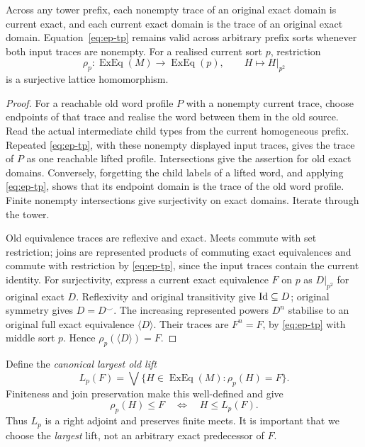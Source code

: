 \begin{proposition}
\label{prop:ep-exact-trace-surj}
Across any tower prefix, each nonempty trace of an original exact
domain is current exact, and each current exact domain is the trace
of an original exact domain. Equation~\eqref{eq:ep-tp} remains valid
across arbitrary prefix sorts whenever both input traces are nonempty.
For a realised current sort \(p\), restriction
\[
 \rho_p:\operatorname{ExEq}(M)\longrightarrow
                  \operatorname{ExEq}(p),\qquad
 H\longmapsto H|_{p^2}
 \tag{E1}\label{eq:ep-rho}
\]
is a surjective lattice homomorphism.
\end{proposition}
\begin{proof}
For a reachable old word profile \(P\) with a nonempty current
trace, choose endpoints of that trace and realise the word
between them in the old source. Read the actual intermediate
child types from the current homogeneous prefix. Repeated
\eqref{eq:ep-tp}, with these nonempty displayed input traces,
gives the trace of \(P\) as one reachable lifted profile.
Intersections give the assertion for old exact domains. Conversely,
forgetting the child labels of a lifted word, and applying
\eqref{eq:ep-tp}, shows that its endpoint domain is the trace of
the old word profile. Finite nonempty intersections give
surjectivity on exact domains. Iterate through the tower.

Old equivalence traces are reflexive and exact.
Meets commute with set restriction; joins are represented
products of commuting exact equivalences and commute with
restriction by \eqref{eq:ep-tp}, since the input traces contain
the current identity. For surjectivity, express a current exact
equivalence \(F\) on \(p\) as \(D|_{p^2}\) for original exact
\(D\). Reflexivity and original transitivity give
\(\mathrm{Id}\subseteq D\); original symmetry gives \(D=D^\smile\).
The increasing represented powers \(D^n\) stabilise to an
original full exact equivalence \(\langle D\rangle\).
Their traces are \(F^n=F\), by
\eqref{eq:ep-tp} with middle sort \(p\). Hence
\(\rho_p(\langle D\rangle)=F\).
\end{proof}

Define the \emph{canonical largest old lift}
\[
 L_p(F)=
 \bigvee\{H\in\operatorname{ExEq}(M):\rho_p(H)=F\}.
 \tag{E2}\label{eq:ep-old-largest}
\]
Finiteness and join preservation make this well-defined and give
\[
  \rho_p(H)\le F
     \quad\Longleftrightarrow\quad H\le L_p(F).
 \tag{E3}\label{eq:ep-adjunction}
\]
Thus \(L_p\) is a right adjoint and preserves finite meets.
It is important that we choose the \emph{largest} lift, not
an arbitrary exact predecessor of \(F\).

